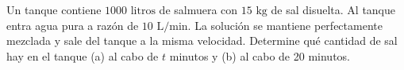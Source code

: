 \item Un tanque contiene $1000 \text{ litros}$ de salmuera con $15 \text{ kg}$ de sal disuelta. Al tanque entra agua pura a razón de $10 \text{ L/min}$. La solución se mantiene perfectamente mezclada y sale del tanque a la misma velocidad. Determine qué cantidad de sal hay en el tanque (a) al cabo de $t$ minutos y (b) al cabo de 20 minutos.
